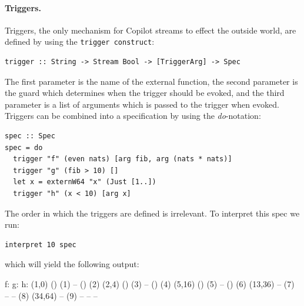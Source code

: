 \paragraph{Triggers.}
Triggers, the only mechanism for Copilot streams to effect the outside world,
are defined by using the {\tt trigger construct}:
%
\begin{lstlisting}[language = Copilot, frame = single]
trigger :: String -> Stream Bool -> [TriggerArg] -> Spec
\end{lstlisting}
%
The first parameter is the name of the external function, the second parameter is the
guard which determines when the trigger should be evoked, and the third parameter
is a list of arguments which is passed to the trigger when evoked.
Triggers can be combined into a specification by using the \emph{do}-notation:
%
\begin{lstlisting}[language = Copilot, frame = single]
spec :: Spec
spec = do
  trigger "f" (even nats) [arg fib, arg (nats * nats)]
  trigger "g" (fib > 10) []
  let x = externW64 "x" (Just [1..])
  trigger "h" (x < 10) [arg x]
\end{lstlisting}
%
The order in which the triggers are defined is irrelevant. To interpret this spec we run:
%
\begin{lstlisting}[language = Copilot, frame = single]
interpret 10 spec
\end{lstlisting}
%
which will yield the following output:
%
\begin{code}
f:        g:	 h:
(1,0)     ()        (1)
--        ()        (2)
(2,4)     ()        (3)
--        ()        (4)
(5,16)    ()        (5)
--        ()        (6)
(13,36)   --	(7)
--        --        (8)
(34,64)   --	(9)
--        --         --
\end{code}
%

